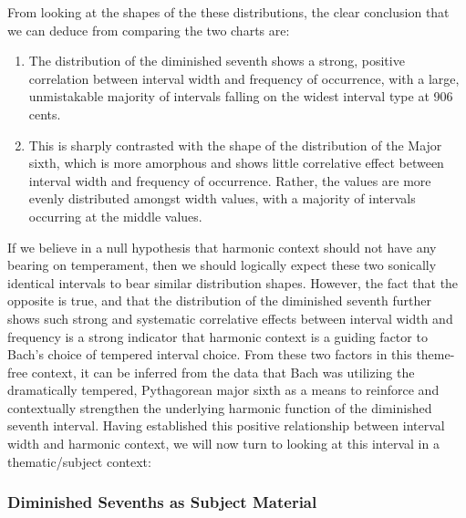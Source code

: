    \begin{center}
    \end{center}
    
    From looking at the shapes of the these distributions, the clear
conclusion that we can deduce from comparing the two charts are:

\begin{enumerate}
\def\labelenumi{\arabic{enumi}.}
\tightlist
\item
  The distribution of the diminished seventh shows a strong, positive
  correlation between interval width and frequency of occurrence, with a
  large, unmistakable majority of intervals falling on the widest
  interval type at 906 cents.
\item
  This is sharply contrasted with the shape of the distribution of the
  Major sixth, which is more amorphous and shows little correlative
  effect between interval width and frequency of occurrence. Rather, the
  values are more evenly distributed amongst width values, with a
  majority of intervals occurring at the middle values.
\end{enumerate}

If we believe in a null hypothesis that harmonic context should not have
any bearing on temperament, then we should logically expect these two
sonically identical intervals to bear similar distribution shapes.
However, the fact that the opposite is true, and that the distribution
of the diminished seventh further shows such strong and systematic
correlative effects between interval width and frequency is a strong
indicator that harmonic context is a guiding factor to Bach's choice of
tempered interval choice. From these two factors in this theme-free
context, it can be inferred from the data that Bach was utilizing the
dramatically tempered, Pythagorean major sixth as a means to reinforce
and contextually strengthen the underlying harmonic function of the
diminished seventh interval. Having established this positive
relationship between interval width and harmonic context, we will now
turn to looking at this interval in a thematic/subject context:

    \subsubsection{Diminished Sevenths as Subject
Material}\label{diminished-sevenths-as-subject-material}

